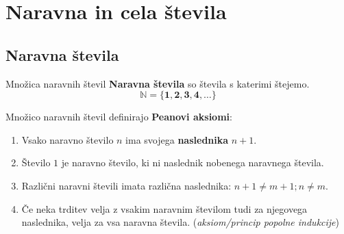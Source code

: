 \chapter{Naravna in cela števila}

 
     \section{Naravna števila}

         {Množica naravnih števil}
            \textbf{Naravna števila} so števila s katerimi štejemo.
            $$\mathbf{\mathbb{N}=\{1, 2, 3, 4, \ldots\}}$$
         

          
            Množico naravnih števil definirajo \textbf{Peanovi aksiomi}:
            \begin{enumerate}
                \item Vsako naravno število $n$ ima svojega \textbf{naslednika} $n+1$.
                \item Število $1$ je naravno število, ki ni naslednik nobenega naravnega števila.
                \item Različni naravni števili imata različna naslednika: $n+1 \neq m+1; n \neq m$.
                \item Če neka trditev velja z vsakim naravnim številom tudi za njegovega naslednika, velja za vsa naravna števila. (\textit{aksiom/princip popolne indukcije})
            \end{enumerate}

         
 

 

